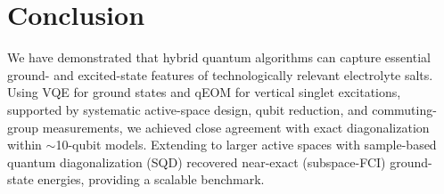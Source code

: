 \documentclass[num-refs]{wiley-article}
\begin{document}





\section{Conclusion}
We have demonstrated that hybrid quantum algorithms can capture essential ground- and excited-state features of technologically relevant electrolyte salts. Using VQE for ground states and qEOM for vertical singlet excitations, supported by systematic active-space design, qubit reduction, and commuting-group measurements, we achieved close agreement with exact diagonalization within $\sim$10-qubit models. Extending to larger active spaces with sample-based quantum diagonalization (SQD) recovered near-exact (subspace-FCI) ground-state energies, providing a scalable benchmark.
\end{document}
